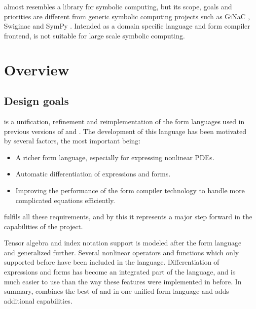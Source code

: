 \ufl{} almost resembles a library for symbolic computing, but its
scope, goals and priorities are different from generic symbolic
computing projects such as GiNaC \citep{BauerFrinkKreckel2000},
Swiginac \citep{SkavhaugCertik2009} and SymPy \citep{Certikothers2009}.
Intended as a domain specific language and form compiler frontend, \ufl{}
is not suitable for large scale symbolic computing.

\section{Overview} \label{ufl:sec:overview}

\subsection{Design goals} \label{ufl:sec:goals}

\ufl{} is a unification, refinement and reimplementation of the
form languages used in previous versions of \ffc{} and \sfc{}.
The development of this language has been motivated by several factors,
the most important being:
\begin{itemize}
  \item A richer form language, especially for expressing nonlinear PDEs.

  \item Automatic differentiation of expressions and forms.

  \item Improving the performance of the form compiler technology to
  handle more complicated equations efficiently.
\end{itemize}
\ufl{} fulfils all these requirements, and by this it represents a major
step forward in the capabilities of the \fenics{} project.

Tensor algebra and index notation support is modeled after the \ffc{}
form language and generalized further. Several nonlinear operators
and functions which only \sfc{} supported before have been included in
the language.  Differentiation of expressions and forms has become an
integrated part of the language, and is much easier to use than the way
these features were implemented in \sfc{} before.  In summary, \ufl{}
combines the best of \ffc{} and \sfc{} in one unified form language and
adds additional capabilities.

